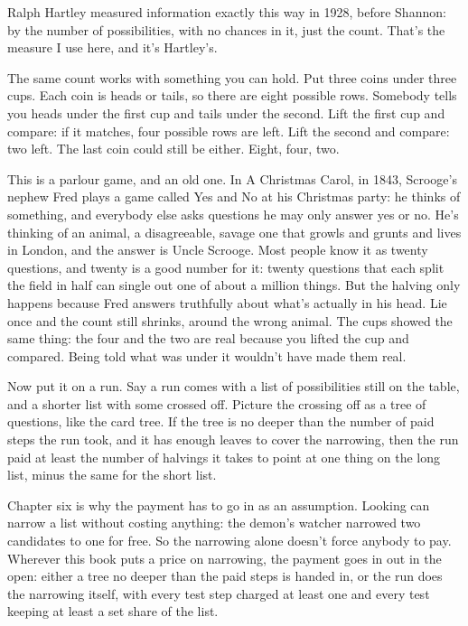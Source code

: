 \documentclass[11pt,twoside]{article}
\theoremstyle{thielethm}
\theoremstyle{thieledef}
\theoremstyle{thieledef}
\theoremstyle{thieledef}
\theoremstyle{thielethm}
\theoremstyle{thieleobs}
\theoremstyle{thielethm}
\begin{document}
Ralph Hartley measured information exactly this way in 1928, before Shannon: by the number of possibilities, with no chances in it, just the count. That's the measure I use here, and it's Hartley's.

The same count works with something you can hold. Put three coins under three cups. Each coin is heads or tails, so there are eight possible rows. Somebody tells you heads under the first cup and tails under the second. Lift the first cup and compare: if it matches, four possible rows are left. Lift the second and compare: two left. The last coin could still be either. Eight, four, two.

This is a parlour game, and an old one. In A Christmas Carol, in 1843, Scrooge's nephew Fred plays a game called Yes and No at his Christmas party: he thinks of something, and everybody else asks questions he may only answer yes or no. He's thinking of an animal, a disagreeable, savage one that growls and grunts and lives in London, and the answer is Uncle Scrooge. Most people know it as twenty questions, and twenty is a good number for it: twenty questions that each split the field in half can single out one of about a million things. But the halving only happens because Fred answers truthfully about what's actually in his head. Lie once and the count still shrinks, around the wrong animal. The cups showed the same thing: the four and the two are real because you lifted the cup and compared. Being told what was under it wouldn't have made them real.

Now put it on a run. Say a run comes with a list of possibilities still on the table, and a shorter list with some crossed off. Picture the crossing off as a tree of questions, like the card tree. If the tree is no deeper than the number of paid steps the run took, and it has enough leaves to cover the narrowing, then the run paid at least the number of halvings it takes to point at one thing on the long list, minus the same for the short list.

Chapter six is why the payment has to go in as an assumption. Looking can narrow a list without costing anything: the demon's watcher narrowed two candidates to one for free. So the narrowing alone doesn't force anybody to pay. Wherever this book puts a price on narrowing, the payment goes in out in the open: either a tree no deeper than the paid steps is handed in, or the run does the narrowing itself, with every test step charged at least one and every test keeping at least a set share of the list.
\end{document}
